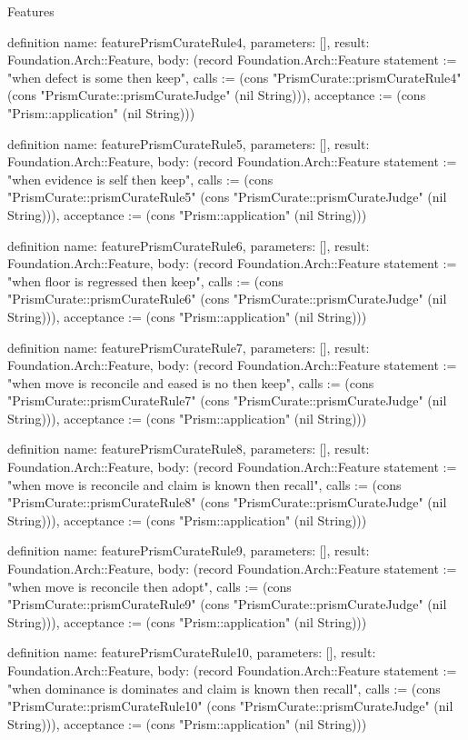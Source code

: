 \begin{lexlean}{Features}
\begin{semanticmodule}
definition{
  name: featurePrismCurateRule4,
  parameters: [],
  result: Foundation.Arch::Feature,
  body: (record Foundation.Arch::Feature {statement := "when defect is some then keep", calls := (cons "PrismCurate::prismCurateRule4" (cons "PrismCurate::prismCurateJudge" (nil String))), acceptance := (cons "Prism::application" (nil String))})
}

definition{
  name: featurePrismCurateRule5,
  parameters: [],
  result: Foundation.Arch::Feature,
  body: (record Foundation.Arch::Feature {statement := "when evidence is self then keep", calls := (cons "PrismCurate::prismCurateRule5" (cons "PrismCurate::prismCurateJudge" (nil String))), acceptance := (cons "Prism::application" (nil String))})
}

definition{
  name: featurePrismCurateRule6,
  parameters: [],
  result: Foundation.Arch::Feature,
  body: (record Foundation.Arch::Feature {statement := "when floor is regressed then keep", calls := (cons "PrismCurate::prismCurateRule6" (cons "PrismCurate::prismCurateJudge" (nil String))), acceptance := (cons "Prism::application" (nil String))})
}

definition{
  name: featurePrismCurateRule7,
  parameters: [],
  result: Foundation.Arch::Feature,
  body: (record Foundation.Arch::Feature {statement := "when move is reconcile and eased is no then keep", calls := (cons "PrismCurate::prismCurateRule7" (cons "PrismCurate::prismCurateJudge" (nil String))), acceptance := (cons "Prism::application" (nil String))})
}

definition{
  name: featurePrismCurateRule8,
  parameters: [],
  result: Foundation.Arch::Feature,
  body: (record Foundation.Arch::Feature {statement := "when move is reconcile and claim is known then recall", calls := (cons "PrismCurate::prismCurateRule8" (cons "PrismCurate::prismCurateJudge" (nil String))), acceptance := (cons "Prism::application" (nil String))})
}

definition{
  name: featurePrismCurateRule9,
  parameters: [],
  result: Foundation.Arch::Feature,
  body: (record Foundation.Arch::Feature {statement := "when move is reconcile then adopt", calls := (cons "PrismCurate::prismCurateRule9" (cons "PrismCurate::prismCurateJudge" (nil String))), acceptance := (cons "Prism::application" (nil String))})
}

definition{
  name: featurePrismCurateRule10,
  parameters: [],
  result: Foundation.Arch::Feature,
  body: (record Foundation.Arch::Feature {statement := "when dominance is dominates and claim is known then recall", calls := (cons "PrismCurate::prismCurateRule10" (cons "PrismCurate::prismCurateJudge" (nil String))), acceptance := (cons "Prism::application" (nil String))})
}


\end{semanticmodule}
\end{lexlean}
